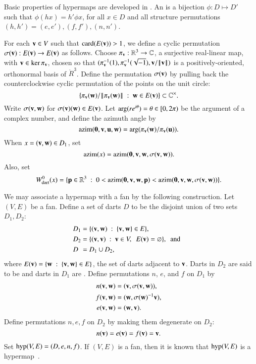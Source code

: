 \documentclass{llncs}
\def\op#1{{\hbox{#1}}}
\begin{document}

Basic properties of hypermaps are developed in \cite[Ch.~4]{DSP}.  An
 is a bijection $\phi:D\mapsto D'$
such that $\phi(h x) = h'\phi x$, for all $x\in D$ and all structure
permutations $(h,h')=(e,e'),(f,f'),(n,n')$.


For each ${\mathbf v}\in V$ such that $\card(E(\v))>1$, we define a cyclic
permutation $\sigma({\mathbf v}):E({\mathbf v})\to E({\mathbf v})$ as follows.  Choose
$\pi_{\mathbf v}:\mathbb{R}^3\to\mathbb{C}$, a surjective real-linear  map, with
$\v\in \op{ker}\,\pi_\v$, chosen so that
$(\pi^{-1}_{\mathbf v}(1),\pi^{-1}_{\mathbf v}(\sqrt{-1}),{\mathbf v}/{\hbox{\ensuremath{\hspace{0.1em}|\hspace{-0.1em}|\hspace{0.1em}}}{\mathbf v}\hbox{\ensuremath{\hspace{0.1em}|\hspace{-0.1em}|\hspace{0.1em}}}})$ is a
positively-oriented, orthonormal basis of $\ring{R}^3$.  Define the
permutation $\sigma({\mathbf v})$ by pulling back the counterclockwise cyclic
permutation of the points on the unit circle:
\[
\{\pi_{\mathbf v}({\mathbf w})/{\hbox{\ensuremath{\hspace{0.1em}|\hspace{-0.1em}|\hspace{0.1em}}}\pi_{\mathbf v}({\mathbf w})\hbox{\ensuremath{\hspace{0.1em}|\hspace{-0.1em}|\hspace{0.1em}}}} \ :\  {\mathbf w}\in E({\mathbf v})\} \subset \mathbb{C}^\times.
\]
Write $\sigma({\mathbf v},{\mathbf w})$ for $\sigma({\mathbf v})({\mathbf w})\in E({\mathbf v})$.  
Let $\op{arg}(r e^{i\theta}) =\theta\in\leftclosed0,2\pi\rightopen$ 
be the argument of a complex number, and define the azimuth angle by
\[
\op{azim}(\orz,\v,\u,\w) = \op{arg}(\pi_\v(\w)/\pi_\v(\u)).
\]
When $x=({\mathbf v},{\mathbf w})\in D_1$, set 
\[
 \op{azim}(x) = \op{azim}(\orz,\v,\w,\sigma(\v,\w)).
\]
Also, set
\[
 \Wdarto(x) = \{\p\in\ring{R}^3 \mid 0 < 
 \azim(\orz,\v,\w,\p) < \azim(\orz,\v,\w,\sigma(\v,\w)) \}.
\]

We may associate a hypermap with a fan by the following
construction.  Let $(V,E)$ be a fan.  Define a set of darts $D$ to be
the disjoint union of two sets $D_1,D_2$:
\begin{align*}
D_1 &= \{({\mathbf v},{\mathbf w})\ :\  \{{\mathbf v},{\mathbf w}\}\in E\},\\
D_2 &= \{({\mathbf v},{\mathbf v}) \ :\  {\mathbf v}\in V,\ \ E({\mathbf v}) = \varnothing\},\text{ \ and \ } \\
D\phantom{_2}   &= D_1\cup D_2,
\end{align*}
where $E({\mathbf v})=\{{\mathbf w} \ :\  \{{\mathbf v},{\mathbf w}\}\in E\}$, the set of darts adjacent to ${\mathbf v}$.
Darts in $D_2$ are said to be  and darts in
$D_1$ are .
%
Define permutations $n$, $e$, and $f$ on $D_1$ by
\begin{align*}n({\mathbf v},{\mathbf w}) &= ({\mathbf v},\sigma({\mathbf v},{\mathbf w})),\\
f ({\mathbf v},{\mathbf w}) &= ({\mathbf w},\sigma({\mathbf w})^{-1} {\mathbf v}),\\
e ({\mathbf v},{\mathbf w}) &= ({\mathbf w},{\mathbf v}).
\end{align*}
Define permutations $n,e,f$ on $D_2$ by making them degenerate on $D_2$:
\[ 
n ({\mathbf v}) = e({\mathbf v}) = f({\mathbf v}) = {\mathbf v}.
\] 
Set %
$\op{hyp}(V,E)=(D,e,n,f)$. 
If $(V,E)$ is a fan, 
then it is known that $\op{hyp}(V,E)$ is a hypermap~\cite{DSP}.
\end{document}
